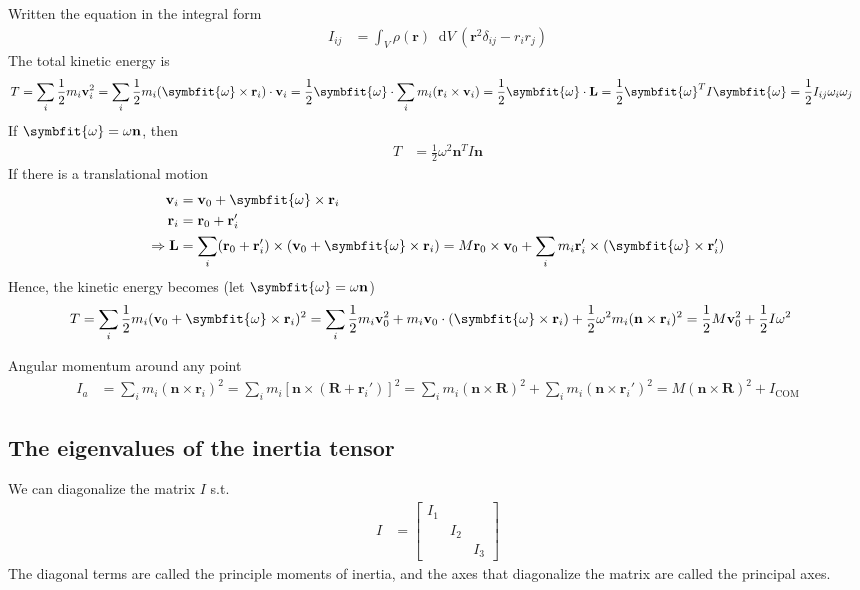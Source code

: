 \documentclass[twoside,9pt]{article}
\numberwithin{equation}{section} %
\renewcommand*\d{\mathop{}\!\mathrm{d}}
\theoremstyle{definition}
\theoremstyle{remark}
\begin{document}
Written the equation in the integral form
\begin{align}
    I_{ij} &= 
    \int_V\rho(\mathbf{r})\d V\ (\mathbf{r}^2\delta_{ij} - r_ir_j)
\end{align}
The total kinetic energy is
\begin{align}
    T 
    &= \sum_i \frac{1}{2}m_i\mathbf{v}_i^2
    = \sum_i \frac{1}{2}m_i(\symbfit{\omega}\times\mathbf{r}_i)\cdot\mathbf{v}_i
    = \frac{1}{2}\symbfit{\omega}\cdot\sum_i m_i(\mathbf{r}_i\times\mathbf{v}_i)
    = \frac{1}{2}\symbfit{\omega}\cdot\mathbf{L}
    = \frac{1}{2}\symbfit{\omega}^T I\symbfit{\omega}
    = \frac{1}{2}I_{ij}\omega_i\omega_j
\end{align}
If $\symbfit{\omega}=\omega\mathbf{n}$, then
\begin{align}
    T &= \frac{1}{2}\omega^2\mathbf{n}^TI\mathbf{n}
\end{align}
If there is a translational motion
\begin{align}
    \mathbf{v}_i &= \mathbf{v}_0 + \symbfit{\omega}\times\mathbf{r}_i\\
    \mathbf{r}_i &= \mathbf{r}_0 + \mathbf{r}_i'\\
    \Rightarrow\mathbf{L}
    &= \sum_i(\mathbf{r}_0+\mathbf{r}_i')\times(\mathbf{v}_0 + \symbfit{\omega}
    \times\mathbf{r}_i)
    = M\mathbf{r}_0\times\mathbf{v}_0 
    + \sum_i m_i\mathbf{r}_i'\times(\symbfit{\omega}\times\mathbf{r}_i')
\end{align}
Hence, the kinetic energy becomes
(let $\symbfit{\omega}=\omega\mathbf{n}$)
\begin{align}
    T &= \sum_i \frac{1}{2}m_i(\mathbf{v}_0 + \symbfit{\omega}\times\mathbf{r}_i)^2
    = \sum_i \frac{1}{2}m_i\mathbf{v}_0^2 + m_i\mathbf{v}_0\cdot
    (\symbfit{\omega}\times\mathbf{r}_i)
    + \frac{1}{2}\omega^2m_i(\mathbf{n}\times\mathbf{r}_i)^2
    = \frac{1}{2}M\mathbf{v}_0^2 + \frac{1}{2}I\omega^2
\end{align}

Angular momentum around any point
\begin{align}
    I_a &= \sum_i m_i(\mathbf{n}\times\mathbf{r}_i)^2
    = \sum_i m_i[\mathbf{n}\times(\mathbf{R} + \mathbf{r}_i')]^2
    = \sum_i m_i(\mathbf{n}\times\mathbf{R})^2 + \sum_i m_i(\mathbf{n}\times
    \mathbf{r}_i')^2
    = M(\mathbf{n}\times\mathbf{R})^2 + I_\text{COM}
\end{align}

\subsection{The eigenvalues of the inertia tensor}
We can diagonalize the matrix $I$ s.t.
\begin{align}
    I &= \begin{bmatrix}
        I_1 & & \\
        & I_2 & \\
        & & I_3
    \end{bmatrix}
\end{align}
The diagonal terms are called the principle moments of inertia,
and the axes that diagonalize the matrix are called the
principal axes.
\end{document}
